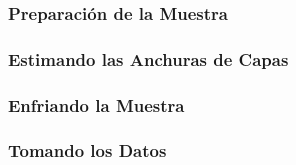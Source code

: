 



\frame
{
  \frametitle{Preparaci\'on de la Muestra}
}




\frame
{
  \frametitle{Estimando las Anchuras de Capas}
 
}


\frame
{
  \frametitle{Enfriando la Muestra}
}

  
  
\frame
{
  \frametitle{Tomando los Datos}
}
